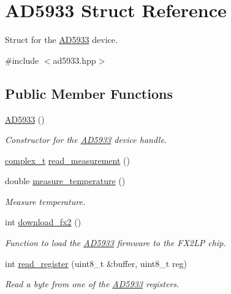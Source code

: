 \hypertarget{struct_a_d5933}{}\section{A\+D5933 Struct Reference}
\label{struct_a_d5933}


Struct for the \mbox{\hyperlink{struct_a_d5933}{A\+D5933}} device.  




{\ttfamily \#include $<$ad5933.\+hpp$>$}

\subsection*{Public Member Functions}
\begin{DoxyCompactItemize}
\item 
\mbox{\hyperlink{struct_a_d5933_a968eabd26cf109703c52274218f1caac}{A\+D5933}} ()
\begin{DoxyCompactList}\small\item\em Constructor for the \mbox{\hyperlink{struct_a_d5933}{A\+D5933}} device handle. \end{DoxyCompactList}\item 
\mbox{\hyperlink{ad5933_8hpp_ae1cf790e72cff992603d30d0abba52f3}{complex\+\_\+t}} \mbox{\hyperlink{struct_a_d5933_ad1d4ef0943cb72ab1574054d5efe5842}{read\+\_\+measurement}} ()
\item 
double \mbox{\hyperlink{struct_a_d5933_a4c95f1c1a29a826ca747378cc4e084ae}{measure\+\_\+temperature}} ()
\begin{DoxyCompactList}\small\item\em Measure temperature. \end{DoxyCompactList}\item 
int \mbox{\hyperlink{struct_a_d5933_a18b02bd0ab0239c9c96aafac457fb387}{download\+\_\+fx2}} ()
\begin{DoxyCompactList}\small\item\em Function to load the \mbox{\hyperlink{struct_a_d5933}{A\+D5933}} firmware to the F\+X2\+LP chip. \end{DoxyCompactList}\item 
int \mbox{\hyperlink{struct_a_d5933_a3fb37885bc122590a2e7d948d17889e0}{read\+\_\+register}} (uint8\+\_\+t \&buffer, uint8\+\_\+t reg)
\begin{DoxyCompactList}\small\item\em Read a byte from one of the \mbox{\hyperlink{struct_a_d5933}{A\+D5933}} registers. \end{DoxyCompactList}\item 

\end{DoxyCompactItemize}
